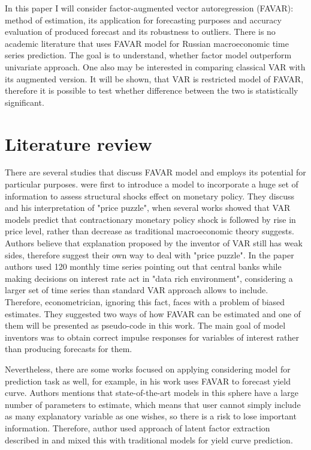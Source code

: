 \documentclass[a4paper, 14pt]{article}
\begin{document}
In this paper I will consider factor-augmented vector autoregression (FAVAR): method of estimation, its application for forecasting purposes and accuracy evaluation of produced forecast and its robustness to outliers. There is no academic literature that uses FAVAR model for Russian macroeconomic time series prediction. The goal is to understand, whether factor model outperform univariate approach. One also may be interested in comparing classical VAR with its augmented version. It will be shown, that VAR is restricted model of FAVAR, therefore it is possible to test whether difference between the two is statistically significant. 
 
\section*{Literature review}
There are several studies that discuss FAVAR model and employs its potential for particular purposes. \cite{bernanke2005measuring} were first to introduce a model to incorporate a huge set of information to assess structural shocks effect on monetary policy. They discuss \cite{sims1992interpreting} and his interpretation of "price puzzle", when several works showed that VAR models predict that contractionary monetary policy shock is followed by rise in price level, rather than decrease as traditional macroeconomic theory suggests. Authors believe that explanation proposed by the inventor of VAR still has weak sides, therefore suggest their own way to deal with "price puzzle". In the paper authors used 120 monthly time series pointing out that central banks while making decisions on interest rate act in "data rich environment", considering a larger set of time series than standard VAR approach allows to include. Therefore, econometrician, ignoring this fact, faces with a problem of biased estimates. They suggested two ways of how FAVAR can be estimated and one of them will be presented as pseudo-code in this work. The main goal of model inventors was to obtain correct impulse responses for variables of interest rather than producing forecasts for them. 

Nevertheless, there are some works focused on applying considering model for prediction task as well, for example,  \cite{monch2008forecasting} in his work uses FAVAR to forecast yield curve. Authors mentions that state-of-the-art models in this sphere have a large number of parameters to estimate, which means that user cannot simply include as many explanatory variable as one wishes, so there is a risk to lose important information. Therefore, author used approach of latent factor extraction described in \cite{bernanke2005measuring} and mixed this with traditional models for yield curve prediction. 
\end{document}
